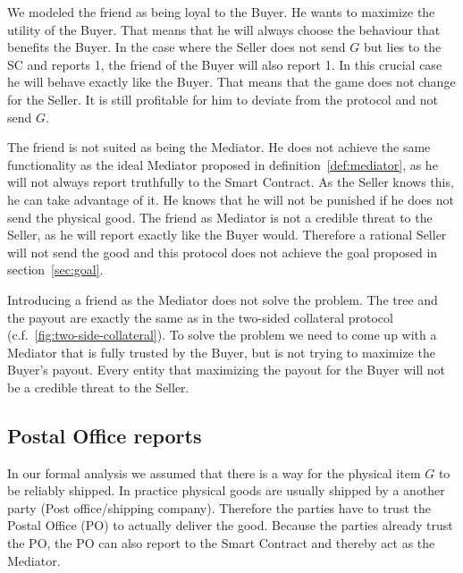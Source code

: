 \documentclass{cacthesis}
\begin{document}
We modeled the friend as being loyal to the Buyer. He wants to maximize the utility of the Buyer.
That means that he will always choose the behaviour that benefits the Buyer. In the case where the Seller does not send $G$ but lies to the SC and reports 1, the friend of the Buyer will also report 1. In this crucial case he will behave exactly like the Buyer. That means that the game does not change for the Seller. It is still profitable for him to deviate from the protocol and not send $G$.\newline

The friend is not suited as being the Mediator. He does not achieve the same functionality as the ideal Mediator proposed in definition~\ref{def:mediator}, as he will not always report truthfully to the Smart Contract. As the Seller knows this, he can take advantage of it. He knows that he will not be punished if he does not send the physical good. The friend as Mediator is not a credible threat to the Seller, as he will report exactly like the Buyer would. Therefore a rational Seller will not send the good and this protocol does not achieve the goal proposed in section~\ref{sec:goal}.\newline

Introducing a friend as the Mediator does not solve the problem. The tree and
the payout are exactly the same as in the two-sided collateral protocol (c.f.~\ref{fig:two-side-collateral}).
To solve the problem we need to come up with a Mediator that is fully trusted by
the Buyer, but is not trying to maximize the Buyer's payout.
Every entity that maximizing the payout for the Buyer will not be a
credible threat to the Seller.


\subsection{Postal Office reports}
In our formal analysis we assumed that there is a way for the physical item $G$ to be reliably shipped. In practice physical goods are usually shipped by a another party (Post office/shipping company).
Therefore the parties have to trust the Postal Office (PO) to actually deliver the good. Because the parties already trust the PO, the PO can also report to the Smart Contract and thereby act as the Mediator.\newline
\end{document}
